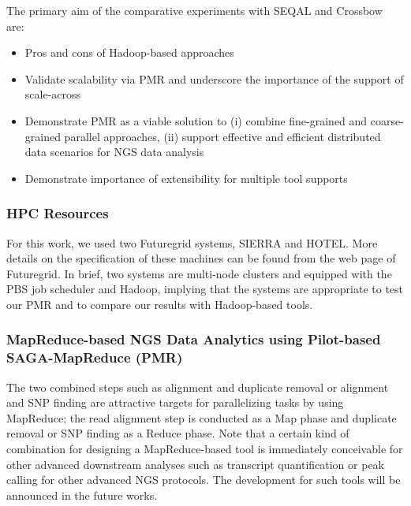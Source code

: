 \documentclass{sig-alternate}
\begin{document}
{The primary aim of the comparative experiments with SEQAL and Crossbow
are:

\begin{itemize}
\item Pros and cons of Hadoop-based approaches
\item Validate scalability via PMR and underscore the importance of the
  support of scale-across
\item Demonstrate PMR as a viable solution to (i) combine fine-grained
  and coarse-grained parallel approaches, (ii) support effective and
  efficient distributed data scenarios for NGS data analysis
\item Demonstrate importance of extensibility for multiple tool
  supports
\end{itemize}

\subsubsection{HPC Resources}
For this work, we used two Futuregrid systems, SIERRA and HOTEL.  More details on the specification of these machines can be found from the web page of Futuregrid\cite{futuregrid_url}.  In brief, two systems are multi-node clusters and equipped with the PBS job scheduler and Hadoop, implying that the systems are appropriate to test our PMR and to compare our results with Hadoop-based tools.

\subsubsection{MapReduce-based NGS Data Analytics using Pilot-based SAGA-MapReduce (PMR)}
The two combined steps such as alignment and duplicate removal or alignment and SNP finding are attractive targets for  parallelizing tasks by using MapReduce; the read alignment step is conducted as a Map phase and duplicate removal or SNP finding as a Reduce phase.  Note that a certain kind of combination for designing a MapReduce-based tool is immediately conceivable for other advanced downstream analyses such as transcript quantification or peak calling for other advanced NGS protocols.  The development for such tools will be announced in the future works.

}
\end{document}
